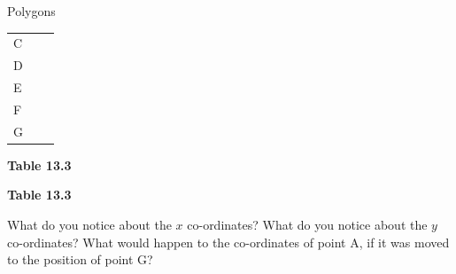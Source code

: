 \begin{exercises}{Polygons}
\begin{table}[H]
\begin{center}
\begin{xtabular}[t]{|l|l|l|}
    
        C &
    
    
         &
    
    
     \tabularnewline{}
    
    
        D &
    
    
         &
    
    
     \tabularnewline{}
    
    
        E &
    
    
         &
    
    
     \tabularnewline{}
    
    
        F &
    
    
         &
    
    
     \tabularnewline{}
    
    
        G &
    
    
         &
    
    
     \tabularnewline{}
    \end{xtabular}
      \end{center}
    \begin{center}{\small\bfseries Table 13.3}\end{center}
    \begin{caption}{\small\bfseries Table 13.3}\end{caption}
\end{table}
      
    \par
  
        
        \label{m39358*id70410}What do you notice about the $x$ co-ordinates? What do you notice about the $y$ co-ordinates?
What would happen to the co-ordinates of point A, if it was moved to the position of point G?
 \par 


\end{exercises}
